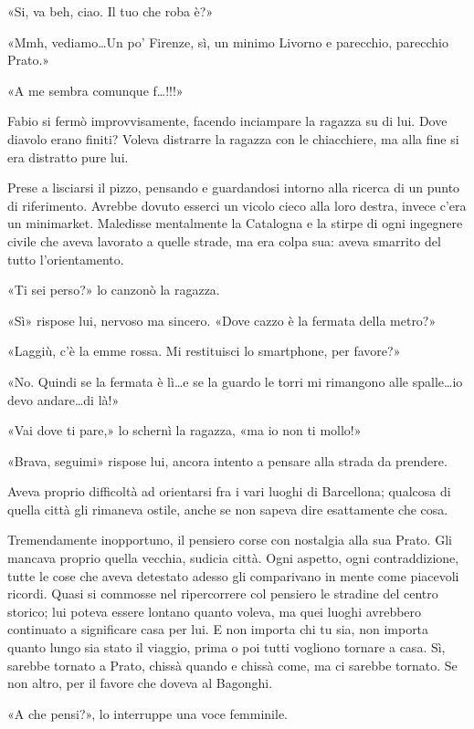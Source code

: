 «Si, va beh, ciao. Il tuo che roba è?»

«Mmh, vediamo\ldots Un po' Firenze, sì, un minimo Livorno e parecchio, parecchio Prato.»

«A me sembra comunque f\ldots !!!»

Fabio si fermò improvvisamente, facendo inciampare la ragazza su di lui. Dove diavolo erano finiti? Voleva distrarre la ragazza con le chiacchiere, ma alla fine si era distratto pure lui.

Prese a lisciarsi il pizzo, pensando e guardandosi intorno alla ricerca di un punto di riferimento. Avrebbe dovuto esserci un vicolo cieco alla loro destra, invece c'era un minimarket. Maledisse mentalmente la Catalogna e la stirpe di ogni ingegnere civile che aveva lavorato a quelle strade, ma era colpa sua: aveva smarrito del tutto l'orientamento.

«Ti sei perso?» lo canzonò la ragazza.

«Sì» rispose lui, nervoso ma sincero. «Dove cazzo è la fermata della metro?»

«Laggiù, c'è la emme rossa. Mi restituisci lo smartphone, per favore?»

«No. Quindi se la fermata è lì\ldots e se la guardo le torri mi rimangono alle spalle\ldots io devo andare\ldots di là!»

«Vai dove ti pare,» lo schernì la ragazza, «ma io non ti mollo!»

«Brava, seguimi» rispose lui, ancora intento a pensare alla strada da prendere.

Aveva proprio difficoltà ad orientarsi fra i vari luoghi di Barcellona; qualcosa di quella città gli rimaneva ostile, anche se non sapeva dire esattamente che cosa.

Tremendamente inopportuno, il pensiero corse con nostalgia alla sua Prato. Gli mancava proprio quella vecchia, sudicia città. Ogni aspetto, ogni contraddizione, tutte le cose che aveva detestato adesso gli comparivano in mente come piacevoli ricordi. Quasi si commosse nel ripercorrere col pensiero le stradine del centro storico; lui poteva essere lontano quanto voleva, ma quei luoghi avrebbero continuato a significare casa per lui. E non importa chi tu sia, non importa quanto lungo sia stato il viaggio, prima o poi tutti vogliono tornare a casa. Sì, sarebbe tornato a Prato, chissà quando e chissà come, ma ci sarebbe tornato. Se non altro, per il favore che doveva al Bagonghi.

«A che pensi?», lo interruppe una voce femminile.

